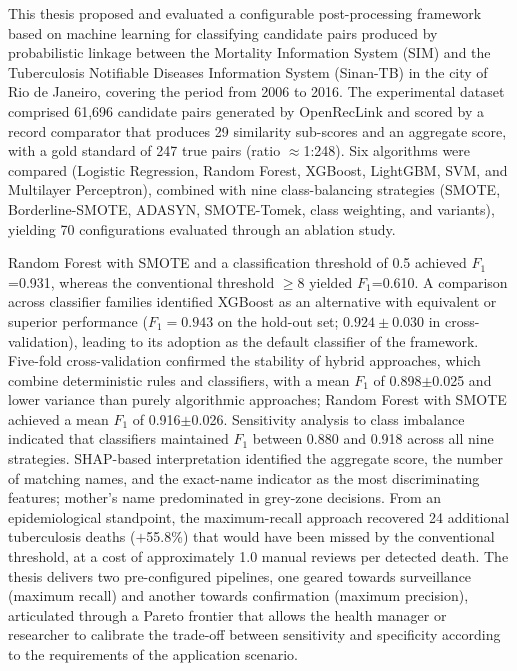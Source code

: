\documentclass[12pt,a4paper,openany]{book}
\begin{document}
This thesis proposed and evaluated a configurable post-processing framework based on machine learning for classifying candidate pairs produced by probabilistic linkage between the Mortality Information System (SIM) and the Tuberculosis Notifiable Diseases Information System (Sinan-TB) in the city of Rio de Janeiro, covering the period from 2006 to 2016.
The experimental dataset comprised 61,696 candidate pairs generated by OpenRecLink and scored by a record comparator that produces 29 similarity sub-scores and an aggregate score, with a gold standard of 247 true pairs (ratio $\approx$1:248).
Six algorithms were compared (Logistic Regression, Random Forest, XGBoost, LightGBM, SVM, and Multilayer Perceptron), combined with nine class-balancing strategies (SMOTE, Borderline-SMOTE, ADASYN, SMOTE-Tomek, class weighting, and variants), yielding 70 configurations evaluated through an ablation study.

Random Forest with SMOTE and a classification threshold of 0.5 achieved $F_1$=0.931, whereas the conventional threshold $\geq$8 yielded $F_1$=0.610. A comparison across classifier families identified XGBoost as an alternative with equivalent or superior performance ($F_1 = 0.943$ on the hold-out set; $0.924 \pm 0.030$ in cross-validation), leading to its adoption as the default classifier of the framework.
Five-fold cross-validation confirmed the stability of hybrid approaches, which combine deterministic rules and classifiers, with a mean $F_1$ of 0.898$\pm$0.025 and lower variance than purely algorithmic approaches; Random Forest with SMOTE achieved a mean $F_1$ of 0.916$\pm$0.026.
Sensitivity analysis to class imbalance indicated that classifiers maintained $F_1$ between 0.880 and 0.918 across all nine strategies.
SHAP-based interpretation identified the aggregate score, the number of matching names, and the exact-name indicator as the most discriminating features; mother's name predominated in grey-zone decisions.
From an epidemiological standpoint, the maximum-recall approach recovered 24 additional tuberculosis deaths ($+$55.8\%) that would have been missed by the conventional threshold, at a cost of approximately 1.0 manual reviews per detected death. The thesis delivers two pre-configured pipelines, one geared towards surveillance (maximum recall) and another towards confirmation (maximum precision), articulated through a Pareto frontier that allows the health manager or researcher to calibrate the trade-off between sensitivity and specificity according to the requirements of the application scenario.
\end{document}
